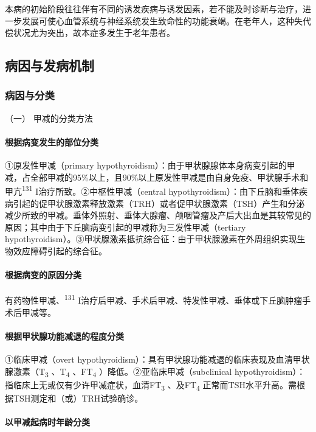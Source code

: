 本病的初始阶段往往伴有不同的诱发疾病与诱发因素，若不能及时诊断与治疗，进一步发展可使心血管系统与神经系统发生致命性的功能衰竭。在老年人，这种失代偿状况尤为突出，故本症多发生于老年患者。

\subsection{病因与发病机制}

\subsubsection{病因与分类}

\hypertarget{text00114.htmlux5cux23CHP4-10-1-1-1}{}
（一） 甲减的分类方法

\paragraph{根据病变发生的部位分类}

①原发性甲减（primary
hypothyroidism）：由于甲状腺腺体本身病变引起的甲减，占全部甲减的95\%以上，且90\%以上原发性甲减是由自身免疫、甲状腺手术和甲亢\textsuperscript{131}
I治疗所致。②中枢性甲减（central
hypothyroidism）：由下丘脑和垂体疾病引起的促甲状腺激素释放激素（TRH）或者促甲状腺激素（TSH）产生和分泌减少所致的甲减。垂体外照射、垂体大腺瘤、颅咽管瘤及产后大出血是其较常见的原因；其中由于下丘脑病变引起的甲减称为三发性甲减（tertiary
hypothyroidism）。③甲状腺激素抵抗综合征：由于甲状腺激素在外周组织实现生物效应障碍引起的综合征。

\paragraph{根据病变的原因分类}

有药物性甲减、\textsuperscript{131}
I治疗后甲减、手术后甲减、特发性甲减、垂体或下丘脑肿瘤手术后甲减等。

\paragraph{根据甲状腺功能减退的程度分类}

①临床甲减（overt
hypothyroidism）：具有甲状腺功能减退的临床表现及血清甲状腺激素（T\textsubscript{3}
、T\textsubscript{4} 、FT\textsubscript{4}
）降低。②亚临床甲减（subclinical
hypothyroidism）：指临床上无或仅有少许甲减症状，血清FT\textsubscript{3}
、及FT\textsubscript{4}
正常而TSH水平升高。需根据TSH测定和（或）TRH试验确诊。

\paragraph{以甲减起病时年龄分类}

